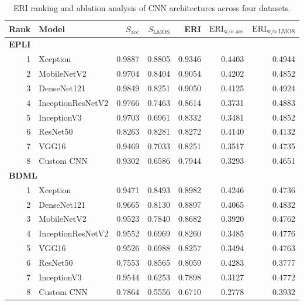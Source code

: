 \documentclass[a4paper,fleqn]{cas-dc}
\begin{document}
\begin{table}[t]
    \centering
    \caption{ERI ranking and ablation analysis of CNN architectures across four datasets.}
    \label{tab:eri_ablation_ranking_all}

    \scriptsize
    \setlength{\tabcolsep}{5pt}
    \renewcommand{\arraystretch}{1.1}

    \begin{tabular}{r l *{5}{r}}
        \toprule
        \textbf{Rank} &
        \textbf{Model} &
        $S_{\text{acc}}$ &
        $S_{\text{LMOS}}$ &
        \textbf{ERI} &
        $\mathrm{ERI}_{\text{w/o acc}}$ &
        $\mathrm{ERI}_{\text{w/o LMOS}}$ \\
        \midrule

        \multicolumn{7}{l}{\textbf{EPLI}} \\
        \midrule
        1 & Xception          & 0.9887 & 0.8805 & 0.9346 & 0.4403 & 0.4944 \\
        2 & MobileNetV2       & 0.9704 & 0.8404 & 0.9054 & 0.4202 & 0.4852 \\
        3 & DenseNet121       & 0.9849 & 0.8251 & 0.9050 & 0.4125 & 0.4924 \\
        4 & InceptionResNetV2 & 0.9766 & 0.7463 & 0.8614 & 0.3731 & 0.4883 \\
        5 & InceptionV3       & 0.9703 & 0.6961 & 0.8332 & 0.3481 & 0.4852 \\
        6 & ResNet50          & 0.8263 & 0.8281 & 0.8272 & 0.4140 & 0.4132 \\
        7 & VGG16             & 0.9469 & 0.7033 & 0.8251 & 0.3517 & 0.4735 \\
        8 & Custom CNN        & 0.9302 & 0.6586 & 0.7944 & 0.3293 & 0.4651 \\

        \midrule
        \multicolumn{7}{l}{\textbf{BDML}} \\
        \midrule
        1 & Xception          & 0.9471 & 0.8493 & 0.8982 & 0.4246 & 0.4736 \\
        2 & DenseNet121       & 0.9665 & 0.8130 & 0.8897 & 0.4065 & 0.4832 \\
        3 & MobileNetV2       & 0.9523 & 0.7840 & 0.8682 & 0.3920 & 0.4762 \\
        4 & InceptionResNetV2 & 0.9552 & 0.6969 & 0.8260 & 0.3485 & 0.4776 \\
        5 & VGG16             & 0.9526 & 0.6988 & 0.8257 & 0.3494 & 0.4763 \\
        6 & ResNet50          & 0.7553 & 0.8565 & 0.8059 & 0.4283 & 0.3777 \\
        7 & InceptionV3       & 0.9544 & 0.6253 & 0.7898 & 0.3127 & 0.4772 \\
        8 & Custom CNN        & 0.7864 & 0.5556 & 0.6710 & 0.2778 & 0.3932 \\


\end{tabular}
\end{table}
\end{document}
